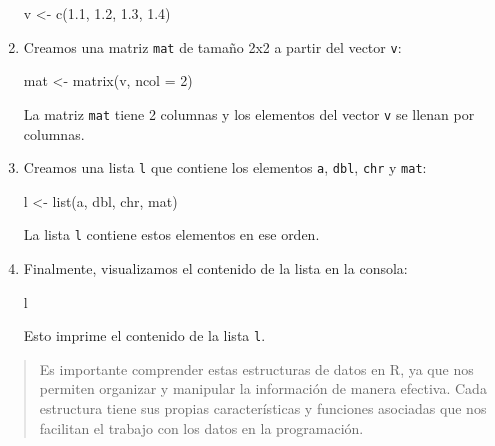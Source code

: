 \documentclass[
  jou,
  floatsintext,
  longtable,
  a4paper,
  nolmodern,
  notxfonts,
  notimes,
  colorlinks=true,linkcolor=blue,citecolor=blue,urlcolor=blue]{apa7}
\newenvironment{Shaded}{\begin{snugshade}}{\end{snugshade}}
\newcommand{\AttributeTok}[1]{\textcolor[rgb]{0.40,0.45,0.13}{#1}}
\newcommand{\DecValTok}[1]{\textcolor[rgb]{0.68,0.00,0.00}{#1}}
\newcommand{\FloatTok}[1]{\textcolor[rgb]{0.68,0.00,0.00}{#1}}
\newcommand{\FunctionTok}[1]{\textcolor[rgb]{0.28,0.35,0.67}{#1}}
\newcommand{\NormalTok}[1]{\textcolor[rgb]{0.00,0.23,0.31}{#1}}
\newcommand{\OtherTok}[1]{\textcolor[rgb]{0.00,0.23,0.31}{#1}}
\begin{document}
\begin{enumerate}
\begin{Shaded}
\begin{Highlighting}[]
\NormalTok{v }\OtherTok{\textless{}{-}} \FunctionTok{c}\NormalTok{(}\FloatTok{1.1}\NormalTok{, }\FloatTok{1.2}\NormalTok{, }\FloatTok{1.3}\NormalTok{, }\FloatTok{1.4}\NormalTok{)}
\end{Highlighting}
\end{Shaded}
\item
  Creamos una matriz \texttt{mat} de tamaño 2x2 a partir del vector
  \texttt{v}:

\begin{Shaded}
\begin{Highlighting}[]
\NormalTok{mat }\OtherTok{\textless{}{-}} \FunctionTok{matrix}\NormalTok{(v, }\AttributeTok{ncol =} \DecValTok{2}\NormalTok{)}
\end{Highlighting}
\end{Shaded}

  La matriz \texttt{mat} tiene 2 columnas y los elementos del vector
  \texttt{v} se llenan por columnas.
\item
  Creamos una lista \texttt{l} que contiene los elementos \texttt{a},
  \texttt{dbl}, \texttt{chr} y \texttt{mat}:

\begin{Shaded}
\begin{Highlighting}[]
\NormalTok{l }\OtherTok{\textless{}{-}} \FunctionTok{list}\NormalTok{(a, dbl, chr, mat)}
\end{Highlighting}
\end{Shaded}

  La lista \texttt{l} contiene estos elementos en ese orden.
\item
  Finalmente, visualizamos el contenido de la lista en la consola:

\begin{Shaded}
\begin{Highlighting}[]
\NormalTok{l}
\end{Highlighting}
\end{Shaded}

  Esto imprime el contenido de la lista \texttt{l}.
\end{enumerate}

\begin{quote}
Es importante comprender estas estructuras de datos en R, ya que nos
permiten organizar y manipular la información de manera efectiva. Cada
estructura tiene sus propias características y funciones asociadas que
nos facilitan el trabajo con los datos en la programación.
\end{quote}
\end{document}
